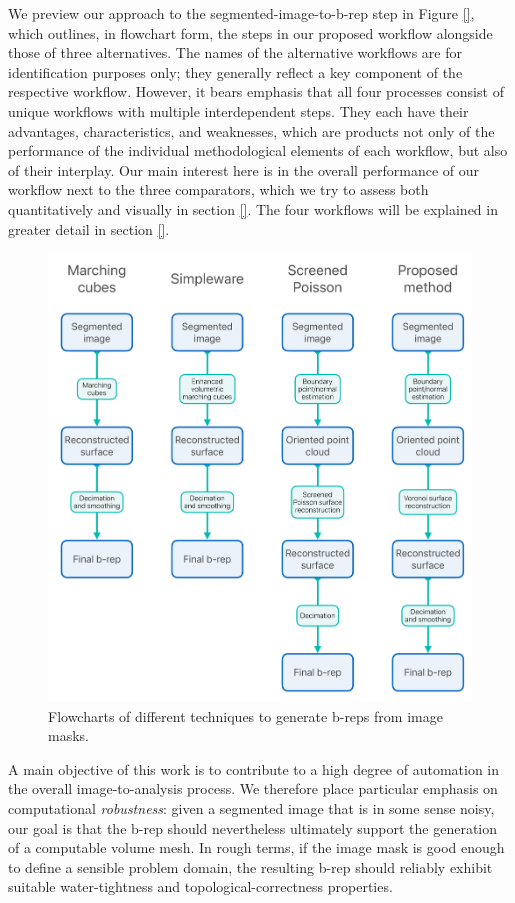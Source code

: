 We preview our approach to the segmented-image-to-b-rep step in Figure \ref{}, which outlines, in flowchart form, the steps in our proposed workflow alongside those of three alternatives.  The names of the alternative workflows are for identification purposes only; they generally reflect a key component of the respective workflow.  However, it bears emphasis that all four processes consist of unique workflows with multiple interdependent steps. They each have their advantages, characteristics, and weaknesses, which are products not only of the performance of the individual methodological elements of each workflow, but also of their interplay.  Our main interest here is in the overall performance of our workflow next to the three comparators, which we try to assess both quantitatively and visually in section \ref{}.  The four workflows will be explained in greater detail in section \ref{}.

\begin{figure}[t]
	\centering
		\includegraphics[scale=0.3]{media/flowchartNew.pdf}
	\caption{Flowcharts of different techniques to generate b-reps from image masks.}
	\label{fig:flowchart}
\end{figure}\noindent

A main objective of this work is to
contribute to a high degree of automation in the overall image-to-analysis process.  We therefore place particular emphasis on 
computational {\em robustness}:  given a segmented image that is in some sense noisy, our goal is that the b-rep should nevertheless ultimately support the generation of a computable volume mesh.  In rough terms, if the image mask is good enough to define a sensible problem domain, the resulting b-rep should reliably exhibit suitable water-tightness and topological-correctness properties.


